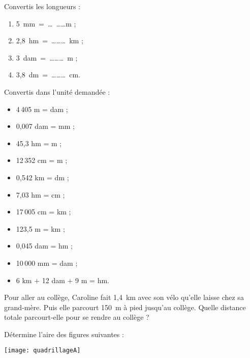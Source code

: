 

\begin{exercice}
Convertis les longueurs :
\begin{enumerate}
 \item 5 mm = \ldots \ldots \ldots m ;
 \item 2,8 hm = \ldots \ldots \ldots km ;
 \item 3 dam = \ldots \ldots \ldots m ;
 \item 3,8 dm = \ldots \ldots \ldots cm.
 \end{enumerate}
\end{exercice}


\begin{exercice}
Convertis dans l’unité demandée :
\begin{itemize}
 \item 4\,405 m = \dotfill dam ;
 \item 0,007 dam = \dotfill mm ;
 \item 45,3 hm = \dotfill m ;
 \item 12\,352 cm = \dotfill m ;
 \item 0,542 km = \dotfill dm ;
 \item 7,03 hm = \dotfill cm ;
 \item 17\,005 cm = \dotfill km ;
 \item 123,5 m = \dotfill km ;
 \item 0,045 dam = \dotfill hm ;
 \item 10\,000 mm =	\dotfill dam ;
 \item 6 km $+$ 12 dam $+$ 9 m = \dotfill hm.
 \end{itemize}
\end{exercice}


\begin{exercice}
Pour aller au collège, Caroline fait 1,4 km avec son vélo qu'elle laisse chez sa grand‑mère. Puis elle parcourt 150 m à pied jusqu'au collège. Quelle distance totale parcourt‑elle pour se rendre au collège ?
\end{exercice}



\begin{exercice}
Détermine l'aire des figures suivantes :

\begin{center} \texttt{[image: quadrillageA]} \end{center}
\end{exercice}


